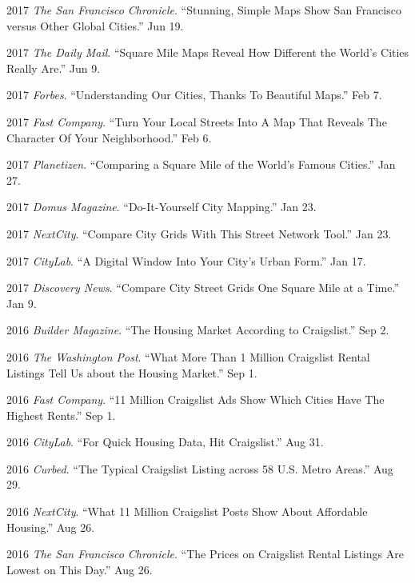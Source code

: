 \documentclass{academiccv}
\begin{document}
\begin{tablist}
	\item 2017 \tab \emph{The San Francisco Chronicle}. \enquote{Stunning, Simple Maps Show San Francisco versus Other Global Cities.} Jun 19.
	
	\item 2017 \tab \emph{The Daily Mail}. \enquote{Square Mile Maps Reveal How Different the World's Cities Really Are.} Jun 9.
	
	\item 2017 \tab \emph{Forbes}. \enquote{Understanding Our Cities, Thanks To Beautiful Maps.} Feb 7.
	
	\item 2017 \tab \emph{Fast Company}. \enquote{Turn Your Local Streets Into A Map That Reveals The Character Of Your Neighborhood.} Feb 6.
	
	\item 2017 \tab \emph{Planetizen}. \enquote{Comparing a Square Mile of the World's Famous Cities.} Jan 27.
	
	\item 2017 \tab \emph{Domus Magazine}. \enquote{Do-It-Yourself City Mapping.} Jan 23.
	
	\item 2017 \tab \emph{NextCity}. \enquote{Compare City Grids With This Street Network Tool.} Jan 23.
	
	\item 2017 \tab \emph{CityLab}. \enquote{A Digital Window Into Your City's Urban Form.} Jan 17.
	
	\item 2017 \tab \emph{Discovery News}. \enquote{Compare City Street Grids One Square Mile at a Time.} Jan 9.
	
	\item 2016 \tab \emph{Builder Magazine}. \enquote{The Housing Market According to Craigslist.} Sep 2.
	
	\item 2016 \tab \emph{The Washington Post}. \enquote{What More Than 1 Million Craigslist Rental Listings Tell Us about the Housing Market.} Sep 1.
	
	\item 2016 \tab \emph{Fast Company}. \enquote{11 Million Craigslist Ads Show Which Cities Have The Highest Rents.} Sep 1.
	
	\item 2016 \tab \emph{CityLab}. \enquote{For Quick Housing Data, Hit Craigslist.} Aug 31.
	
	\item 2016 \tab \emph{Curbed}. \enquote{The Typical Craigslist Listing across 58 U.S. Metro Areas.} Aug 29.
	
	\item 2016 \tab \emph{NextCity}. \enquote{What 11 Million Craigslist Posts Show About Affordable Housing.} Aug 26.
	
	\item 2016 \tab \emph{The San Francisco Chronicle}. \enquote{The Prices on Craigslist Rental Listings Are Lowest on This Day.} Aug 26.
\end{tablist}
\end{document}
